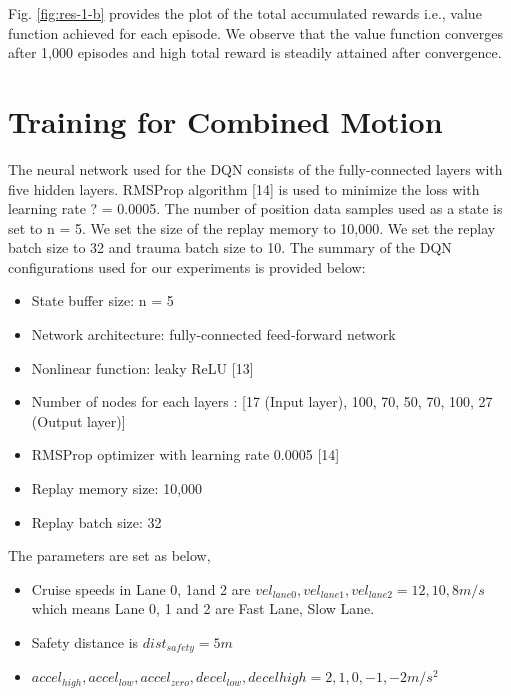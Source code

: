 Fig. \ref{fig:res-1-b} provides the plot of the total accumulated rewards i.e., value function achieved for each episode. We observe that the value function converges after 1,000 episodes and high total reward is steadily attained after convergence.

\section{Training for Combined Motion}

The neural network used for the DQN consists of the fully-connected layers with five hidden layers. RMSProp algorithm [14] is used to minimize the loss with learning rate ? = 0.0005. The number of position data samples used as a state is set to n = 5. We set the size of the replay memory to 10,000. We set the replay batch size to 32 and trauma batch size to 10. The summary of the DQN configurations used for our experiments is provided below:

\begin{itemize}
\item State buffer size: n = 5
\item Network architecture: fully-connected feed-forward network
\item Nonlinear function: leaky ReLU [13]
\item Number of nodes for each layers : [17 (Input layer), 100, 70, 50, 70, 100, 27 (Output layer)]
\item RMSProp optimizer with learning rate 0.0005 [14]
\item Replay memory size: 10,000
\item Replay batch size: 32
\end{itemize}

The parameters are set as below,

\begin{itemize}
\item Cruise speeds in Lane 0, 1and 2 are $vel_{lane0}, vel_{lane1}, vel_{lane2} = {12, 10, 8} m/s$ which means Lane 0, 1 and 2 are Fast Lane, Slow Lane.
\item Safety distance is $dist_{safety} = 5 m$
\item $accel_{high}, accel_{low}, accel_{zero}, decel_{low}, decel{high} = {2, 1, 0, -1, -2} m/s^2$
\end{itemize}

